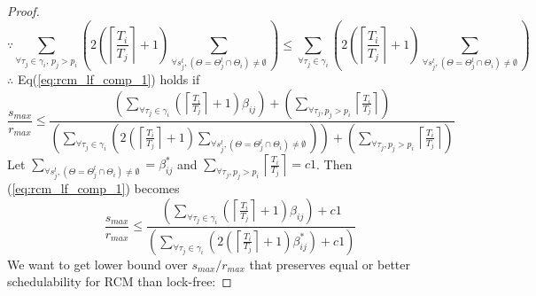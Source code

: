 \begin{proof}
\begin{equation}
\label{eq:rcm_lf_comp_1}
\end{equation}
%
\begin{equation*}
\because \sum_{\forall\tau_{j}\in\gamma_{i},\,p_j>p_i}\left(2\left(\left\lceil \frac{T_{i}}{T_{j}}\right\rceil +1\right)\sum_{\forall s_{j}^{l},\left(\Theta=\Theta_{j}^{l}\cap\Theta_{i}\right)\neq\emptyset}\right) \le 
\sum_{\forall\tau_{j}\in\gamma_{i}}\left(2\left(\left\lceil \frac{T_{i}}{T_{j}}\right\rceil +1\right)\sum_{\forall s_{j}^{l},\left(\Theta=\Theta_{j}^{l}\cap\Theta_{i}\right)\neq\emptyset}\right)
\end{equation*} 
%
$\therefore$ Eq(\ref{eq:rcm_lf_comp_1}) holds if 
%
\begin{equation}
\frac{s_{max}}{r_{max}}\le\frac{\left(\sum_{\forall\tau_{j}\in\gamma_{i}}\left(\left\lceil \frac{T_{i}}{T_{j}}\right\rceil +1\right)\beta_{ij}\right)+\left(\sum_{\forall\tau_{j},p_{j}>p_{i}}\left\lceil \frac{T_{i}}{T_{j}}\right\rceil \right)}{\left(\sum_{\forall\tau_{j}\in\gamma_{i}}\left(2\left(\left\lceil \frac{T_{i}}{T_{j}}\right\rceil +1\right)\sum_{\forall s_{j}^{l},\left(\Theta=\Theta_{j}^{l}\cap\Theta_{i}\right)\neq\emptyset}\right)\right)+\left(\sum_{\forall\tau_{j},p_{j}>p_{i}}\left\lceil \frac{T_{i}}{T_{j}}\right\rceil \right)}
\label{eq:rcm_lf_comp_2}
\end{equation}
%
Let $\sum_{\forall s_{j}^{l},\left(\Theta=\Theta_{j}^{l}\cap\Theta_{i}\right)\neq\emptyset}=\beta_{ij}^{*}$
and $\sum_{\forall\tau_{j},p_{j}>p_{i}}\left\lceil \frac{T_{i}}{T_{j}}\right\rceil =c1$.
Then (\ref{eq:rcm_lf_comp_1}) becomes 
%
\begin{equation}
\frac{s_{max}}{r_{max}}\le\frac{\left(\sum_{\forall\tau_{j}\in\gamma_{i}}\left(\left\lceil \frac{T_{i}}{T_{j}}\right\rceil +1\right)\beta_{ij}\right)+c1}{\left(\sum_{\forall\tau_{j}\in\gamma_{i}}\left(2\left(\left\lceil \frac{T_{i}}{T_{j}}\right\rceil +1\right)\beta_{ij}^{*}\right)+c1\right)}
\label{eq:rcm_lf_comp_3}
\end{equation}
%
We want to get lower bound over $s_{max}/r_{max}$ that preserves equal or better schedulability for RCM than lock-free:


\end{proof}
